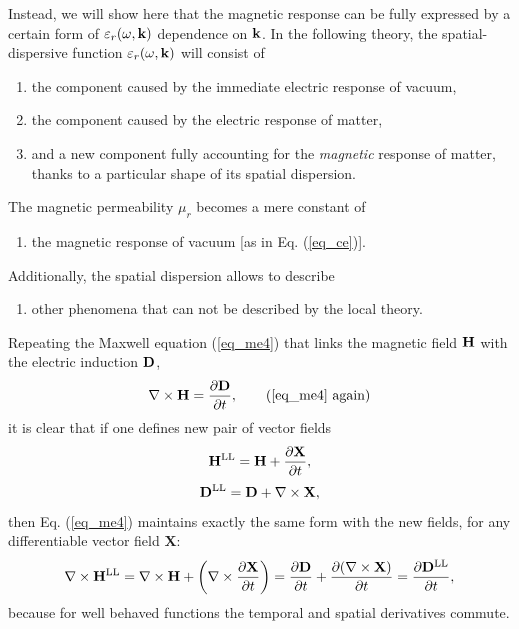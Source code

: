 Instead, we will show here that the magnetic response can be fully expressed by a certain form of $\varepsilon_r(\omega, {\mathbf{k}})$ dependence on ${\mathbf{k}}$. In the following theory, the spatial-dispersive function $\varepsilon_r(\omega, {\mathbf{k}})$ will consist of
\begin{enumerate}
 \item{the component caused by the immediate electric response of vacuum,} 
 \item{the component caused by the electric response of matter,}
 \item{and a new component fully accounting for the \textit{magnetic} response of matter, thanks to a particular shape of its spatial dispersion.}
\end{enumerate}
The magnetic permeability $\mu_r$ becomes a mere constant of
\begin{enumerate}[resume]
 \item{the magnetic response of vacuum [as in Eq. (\ref{eq_ce})].} 
\end{enumerate}
Additionally, the spatial dispersion allows to describe
\begin{enumerate}[resume]
 \item{other phenomena that can not be described by the local theory.} 
\end{enumerate}
Repeating the Maxwell equation (\ref{eq_me4}) that links the magnetic field $\mathbf{H}$ with the electric induction $\mathbf{D}$, 
\begin{equation} \nabla \times \HH =  \frac{\partial \D} {\partial t}, \tag{\ref{eq_me4} \again} \end{equation}
it is clear that if one defines new pair of vector fields
\begin{equation} {\mathbf{H}^\text{LL}} = \mathbf{H} + \frac{\partial\mathbf{X}}{\partial t}, \label{eq_HHsd}\end{equation}
\begin{equation} {\mathbf{D}^\text{LL}}  = \mathbf{D}  + \nabla\times \mathbf{X}, \label{eq_Dsd}\end{equation}
then Eq. (\ref{eq_me4}) maintains exactly the same form with the new fields, for any differentiable vector field $\mathbf{X}$:
\begin{equation} \nabla \times {\mathbf{H}^\text{LL}} = \nabla \times \mathbf{H} + \left(\nabla\times \frac{\partial\mathbf{X}}{\partial t}\right) = \frac{\partial \mathbf{D}}{\partial t}+ \frac{\partial(\nabla\times \mathbf{X})}{\partial t} =  \frac{\partial {\mathbf{D}^\text{LL}}} {\partial t}, \label{eq_me4sd} \end{equation}
because for well behaved functions the temporal and spatial derivatives commute.

